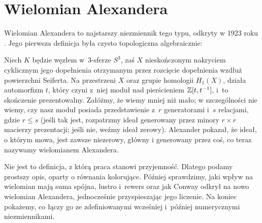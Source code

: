 
\section{Wielomian Alexandera}
%
Wielomian Alexandera to najstarszy niezmiennik tego typu, odkryty w 1923 roku \cite{alexander1923}.
Jego pierwsza definicja była czysto topologiczna algebraicznie:

\begin{definition}
    Niech $K$ będzie węzłem w~3-sferze $S^3$, zaś $X$ nieskończonym nakryciem cyklicznym jego dopełnienia otrzymanym przez rozcięcie dopełnienia wzdłuż powierzchni Seiferta.
%
    Na przestrzeni $X$ oraz grupie homologii $H_1(X)$, działa automorfizm $t$, który czyni z~niej moduł nad pierścieniem $\mathbb Z[t, t^{-1}]$, i~to skończenie prezentowalny.
    Załóżmy, że wiemy mniej niż mało; w szczególności nie wiemy, czy nasz moduł posiada przedstawienie z~$r$ generatorami i~$s$ relacjami, gdzie $r \le s$ (jeśli tak jest, rozpatrzmy ideał generowany przez minory $r \times r$ macierzy prezentacji; jeśli nie, weźmy ideał zerowy).
    Alexander pokazał, że ideał, o którym mowa, jest zawsze niezerowy, główny i generowany przez coś, co teraz nazywamy wielomianem Alexandera.
\end{definition}

Nie jest to definicja, z którą praca stanowi przyjemność.
Dlatego podamy prostszy opis, oparty o równania kolorujące.
Później sprawdzimy, jaki wpływ na wielomian mają suma spójna, lustro i~rewers oraz jak Conway odkrył na nowo wielomian Alexandera, jednocześnie przyspieszając jego liczenie.
Na koniec pokażemy, co łączy go ze zdefiniowanymi wcześniej i~później numerycznymi niezmiennikami.













%

